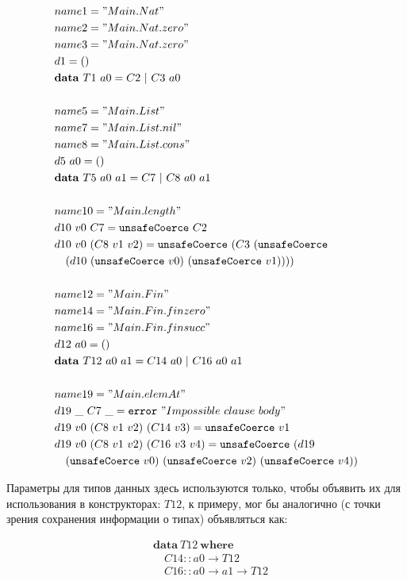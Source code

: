 \begin{align*}
&name1 = "Main.Nat"\\
&name2 = "Main.Nat.zero"\\
&name3 = "Main.Nat.zero"\\
&d1 = ()\\
&\mathbf{data}\ T1\ a0 = C2\ |\ C3\ a0\\
\\
&name5 = "Main.List"\\
&name7 = "Main.List.nil"\\
&name8 = "Main.List.cons"\\
&d5\ a0 = ()\\
&\mathbf{data}\ T5\ a0\ a1 = C7\ |\ C8\ a0\ a1\\
\\
&name10 = "Main.length"\\
&d10\ v0\ C7 = \texttt{unsafeCoerce}\ C2\\
&d10\ v0\ (C8\ v1\ v2) = \texttt{unsafeCoerce}\ (C3\ (\texttt{unsafeCoerce}\\
&\quad(d10\ (\texttt{unsafeCoerce}\ v0)\ (\texttt{unsafeCoerce}\ v1))))\\
\\
&name12 = "Main.Fin"\\
&name14 = "Main.Fin.finzero"\\
&name16 = "Main.Fin.finsucc"\\
&d12\ a0 = ()\\
&\mathbf{data}\ T12\ a0\ a1 = C14\ a0\ |\ C16\ a0\ a1\\
\\
&name19 = "Main.elemAt"\\
&d19\ \_\ C7\ \_ = \texttt{error}\ "Impossible\ clause\ body"\\
&d19\ v0\ (C8\ v1\ v2)\ (C14\ v3) = \texttt{unsafeCoerce}\ v1\\
&d19\ v0\ (C8\ v1\ v2)\ (C16\ v3\ v4) = \texttt{unsafeCoerce}\ (d19\\
&\quad(\texttt{unsafeCoerce}\ v0)\ (\texttt{unsafeCoerce}\ v2)\ (
   \texttt{unsafeCoerce}\ v4))
\end{align*}

Параметры для типов данных здесь используются только, чтобы объявить
их для использования в конструкторах: \(T12\), к примеру, мог бы аналогично
(с точки зрения сохранения информации о типах) объявляться как:

\begin{align*}
&\mathbf{data}\ T12\ \mathbf{where}\\
&\quad C14 :: a0 \rightarrow T12\\
&\quad C16 :: a0 \rightarrow a1 \rightarrow T12
\end{align*}

